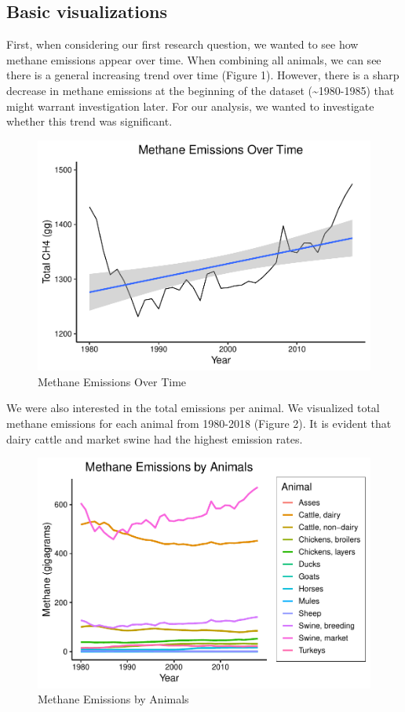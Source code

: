 \documentclass[
  12pt,
]{article}
\begin{document}
\hypertarget{basic-visualizations}{%
\subsection{Basic visualizations}\label{basic-visualizations}}

First, when considering our first research question, we wanted to see
how methane emissions appear over time. When combining all animals, we
can see there is a general increasing trend over time (Figure 1).
However, there is a sharp decrease in methane emissions at the beginning
of the dataset (\textasciitilde1980-1985) that might warrant
investigation later. For our analysis, we wanted to investigate whether
this trend was significant.

\begin{figure}
\centering
\includegraphics{Methane_Project_Template_files/figure-latex/unnamed-chunk-2-1.pdf}
\caption{Methane Emissions Over Time}
\end{figure}

We were also interested in the total emissions per animal. We visualized
total methane emissions for each animal from 1980-2018 (Figure 2). It is
evident that dairy cattle and market swine had the highest emission
rates.

\begin{figure}
\centering
\includegraphics{Methane_Project_Template_files/figure-latex/unnamed-chunk-3-1.pdf}
\caption{Methane Emissions by Animals}
\end{figure}
\end{document}
